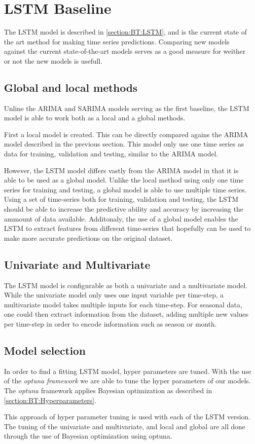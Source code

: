 \section{LSTM Baseline}
\label{section:Architecture:Baselines:LSTM}

The LSTM model is described in \cref{section:BT:LSTM}, and is the current state of the art method for making time series predictions.
Comparing new models against the current state-of-the-art models serves as a good measure for weither or not the new models is usefull.

\subsection{Global and local methods}
Unline the ARIMA and SARIMA models serving as the first baseline,
the LSTM model is able to work both as a local and a global methods.

First a local model is created. This can be directly compared agains the ARIMA model described in the previous section.
This model only use one time series as data for training, validation and testing, similar to the ARIMA model.

However, the LSTM model differs vastly from the ARIMA model in that it is able to be used as a global model.
Unlike the local method using only one time series for training and testing,
a global model is able to use multiple time series.
Using a set of time-series both for training, validation and testing,
the LSTM should be able to increase the predictive ability and accuracy by increasing the ammount of data available.
Additonaly, the use of a global model enables the LSTM to extract features from different time-series that hopefully can be used to make more accurate predictions on the original dataset.

\subsection{Univariate and Multivariate}
The LSTM model is configurable as both a univariate and a multivariate model.
While the univariate model only uses one input variable per time-step, a multivariate model takes multiple inputs for each time-step.
For seasonal data, one could then extract information from the dataset, adding multiple new values per time-step in order to encode information such as season or month.

\subsection{Model selection}
In order to find a fitting LSTM model, hyper parameters are tuned.
With the use of the \textit{optuna framework} %
we are able to tune the hyper parameters of our models.
The \textit{optuna} framework applies Bayesian optimization as described in \cref{section:BT:Hyperparameters}.

This approach of hyper parameter tuning is used with each of the LSTM version.
The tuning of the univariate and multivariate, and local and global are all done through the use of Bayesian optimization using optuna.


